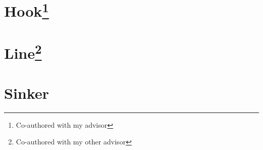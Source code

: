 \documentclass[11pt]{gsasthesis} %
\begin{document}
\chapter{Hook\texorpdfstring{\footnote{Co-authored with my advisor}}{}}\label{ch:1}


\chapter{Line\texorpdfstring{\footnote{Co-authored with my other advisor}}{}}\label{ch:2}


\chapter{Sinker}\label{ch:3}




\begin{singlespacing}
  \renewcommand{\bibname}{References}

  
  
\end{singlespacing}


\end{document}
